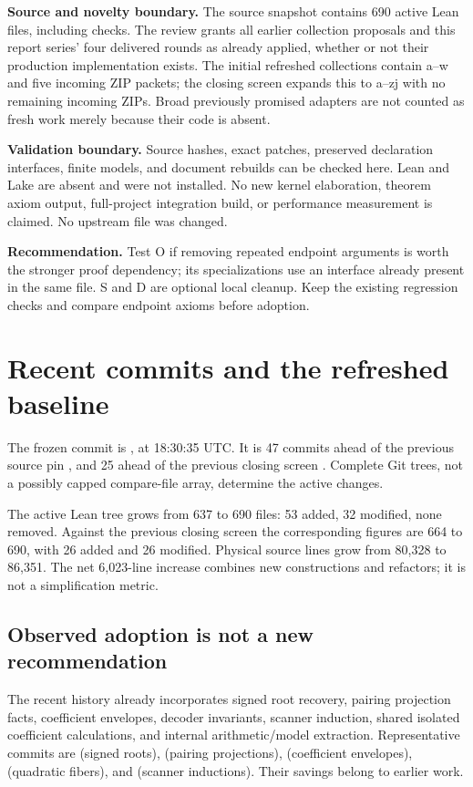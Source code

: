 \textbf{Source and novelty boundary.} The source snapshot contains 690 active Lean files, including checks. The review grants all earlier collection proposals and this report series' four delivered rounds as already applied, whether or not their production implementation exists. The initial refreshed collections contain a--w and five incoming ZIP packets; the closing screen expands this to a--zj with no remaining incoming ZIPs. Broad previously promised adapters are not counted as fresh work merely because their code is absent.

\textbf{Validation boundary.} Source hashes, exact patches, preserved declaration interfaces, finite models, and document rebuilds can be checked here. Lean and Lake are absent and were not installed. No new kernel elaboration, theorem axiom output, full-project integration build, or performance measurement is claimed. No upstream file was changed.

\textbf{Recommendation.} Test O if removing repeated endpoint arguments is worth the stronger proof dependency; its specializations use an interface already present in the same file. S and D are optional local cleanup. Keep the existing regression checks and compare endpoint axioms before adoption.



\newpage
\section{Recent commits and the refreshed baseline}
The frozen commit is , at 18:30:35 UTC. It is 47 commits ahead of the previous source pin , and 25 ahead of the previous closing screen . Complete Git trees, not a possibly capped compare-file array, determine the active changes.

The active Lean tree grows from 637 to 690 files: 53 added, 32 modified, none removed. Against the previous closing screen the corresponding figures are 664 to 690, with 26 added and 26 modified. Physical source lines grow from 80,328 to 86,351. The net 6,023-line increase combines new constructions and refactors; it is not a simplification metric.

\subsection{Observed adoption is not a new recommendation}
The recent history already incorporates signed root recovery, pairing projection facts, coefficient envelopes, decoder invariants, scanner induction, shared isolated coefficient calculations, and internal arithmetic/model extraction. Representative commits are  (signed roots),  (pairing projections),  (coefficient envelopes),  (quadratic fibers), and  (scanner inductions). Their savings belong to earlier work.

